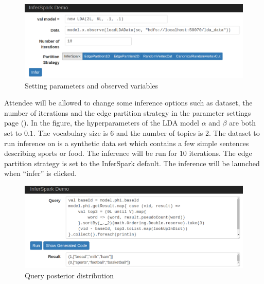 



\begin{figure}[!h]
    \includegraphics[width=\linewidth]{figs/demo_param.png}
    \vspace*{-10pt}
    \caption{Setting parameters and observed variables}
    \label{fig:demo_param}
\end{figure}

Attendee will be allowed to change some inference options such as dataset, the
number of iterations and the edge partition strategy in the parameter settings
page (). In the figure, the hyperparameters of the LDA
model $\alpha$ and $\beta$ are both set to $0.1$. The vocabulary size is 6 and
the number of topics is 2. The dataset to run inference on is a synthetic data
set which contains a few simple sentences describing sports or food. The
inference will be run for 10 iterations. The edge partition strategy is set to
the InferSpark default. The inference will be launched when ``infer'' is
clicked.

\begin{figure}[!h]
    \includegraphics[width=\linewidth]{figs/demo_get_result.png}
    \vspace*{-10pt}
    \caption{Query posterior distribution}
    \label{fig:demo_get_result}
\end{figure}

